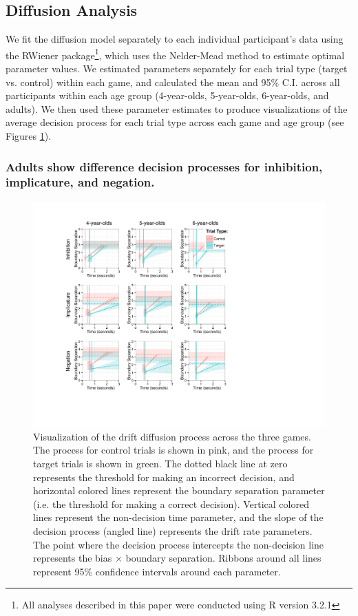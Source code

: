 \documentclass[10pt,letterpaper]{article}
\begin{document}
\subsection{Diffusion Analysis}

We fit the diffusion model separately to each individual participant's data using the RWiener package\footnote{All analyses described in this paper were conducted using R version 3.2.1}, which uses the Nelder-Mead method to estimate optimal parameter values.  We estimated parameters separately for each trial type (target vs. control) within each game, and calculated the mean and 95\% C.I. across all participants within each age group (4-year-olds, 5-year-olds, 6-year-olds, and adults).  We then used these parameter estimates to produce visualizations of the average decision process for each trial type across each game and age group (see Figures \ref{fig:ddm}).  

\subsubsection{Adults show difference decision processes for inhibition, implicature, and negation.}

\begin{figure}
\begin{center} 
\includegraphics[width=6in]{figures/ddm_vis.pdf}
\caption{\label{fig:ddm} Visualization of the drift diffusion process across the three games.  The process for control trials is shown in pink, and the process for target trials is shown in green.  The dotted black line at zero represents the threshold for making an incorrect decision, and horizontal colored lines represent the boundary separation parameter (i.e. the threshold for making a correct decision).  Vertical colored lines represent the non-decision time parameter, and the slope of the decision process (angled line) represents the drift rate parameters.  The point where the decision process intercepts the non-decision line represents the bias $\times$ boundary separation.  Ribbons around all lines represent 95\% confidence intervals around each parameter.}
\end{center} 
\end{figure}
\end{document}
